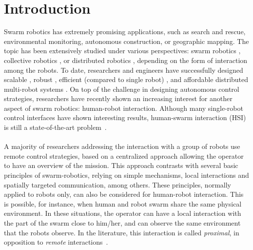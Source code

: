 \documentclass[smallextended]{svjour3}
\begin{document}
\section{Introduction}
\label{sec:introduction}
Swarm robotics has extremely promising applications, such as search and rescue, environmental monitoring, autonomous construction, or geographic mapping. 
The topic has been extensively studied under various perspectives: swarm robotics \cite{brambilla2013}, collective robotics \cite{kernbach2013handbook}, or distributed robotics \cite{martinoli2012distributed}, depending on the form of interaction among the robots. 
To date, researchers and engineers have successfully designed scalable \cite{rubenstein2012kilobot}, robust \cite{winfield2006safety}, efficient (compared to single robot) \cite{Bonani2012}, and affordable distributed multi-robot systems \cite{rubenstein2014programmable}. 
On top of the challenge in designing autonomous control strategies, researchers have recently shown an increasing interest for another aspect of swarm robotics: human-robot interaction. 
Although many single-robot control interfaces have shown interesting results, human-swarm interaction (HSI) is still a state-of-the-art problem~\cite{Kolling2016}. \\
\\
A majority of researchers addressing the interaction with a group of robots use remote control strategies, based on a centralized approach allowing the operator to have an overview of the mission. 
This approach contrasts with several basic principles of swarm-robotics, relying on simple mechanisms, local interactions and spatially targeted communication, among others. 
These principles, normally applied to robots only, can also be considered for human-robot interaction.
This is possible, for instance, when human and robot swarm share the same physical environment. 
In these situations, the operator can have a local interaction with the part of the swarm close to him/her, and can observe the same environment that the robots observe. 
In the literature, this interaction is called \textit{proximal}, in opposition to \textit{remote} interactions~\cite{Kolling2016}.\\
\\
\end{document}
